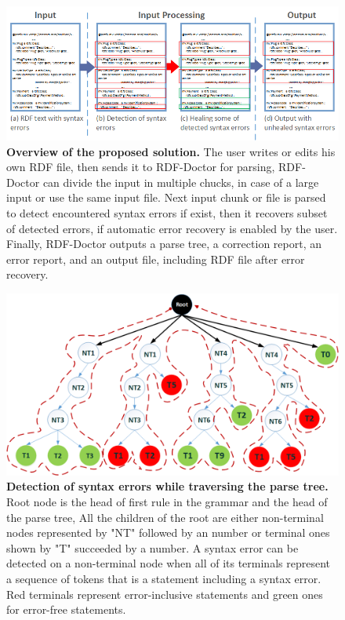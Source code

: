 \begin{figure}
	\centering
	  	\includegraphics[width=1\textwidth]{images/Approach.png}
		\caption{\textbf{Overview of the proposed solution.} The user writes or edits his own RDF file, then sends it to RDF-Doctor for parsing, RDF-Doctor can divide the input in multiple chucks, in case of a large input or use the same input file. Next input chunk or file is parsed to detect encountered syntax errors if exist, then it recovers subset of detected errors, if automatic error recovery is enabled by the user. Finally, RDF-Doctor outputs a parse tree, a correction report, an error report, and an output file, including RDF file after error recovery.}
		\label{Fig:Approach}  
\end{figure}
\begin{figure}
	\centering
	  	\includegraphics[width=.8\textwidth]{images/approachParseTree.png}
		\caption{\textbf{Detection of syntax errors while traversing the parse tree.} Root node is the head of first rule in the grammar and the head of the parse tree, All the children of the root are either  non-terminal nodes represented by "NT" followed by an number or  terminal ones shown by "T" succeeded by a number. A syntax error can be detected on a non-terminal node when all of its terminals represent a sequence of tokens that is a statement including a syntax error. Red terminals represent error-inclusive statements and green ones for error-free statements.}
		\label{Fig:approachParseTree}  
\end{figure}


